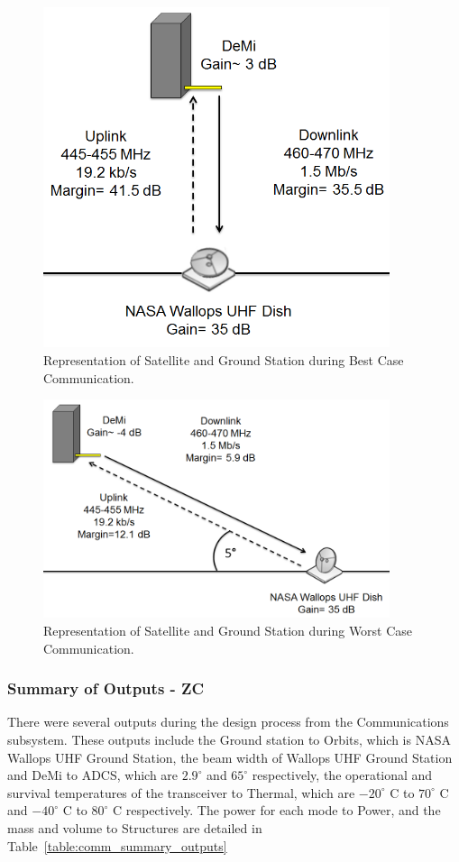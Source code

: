 \documentclass[12pt]{article}
\begin{document}
\begin{figure}[ht]\label{fig:comm_best}
\centering
  \includegraphics[width=4in]{images/comm-best.png}
\caption{Representation of Satellite and Ground Station during Best Case Communication.}
\end{figure}

\begin{figure}[ht]\label{fig:comm_worst}
\centering
  \includegraphics[width=4in]{images/comm-worst.png}
\caption{Representation of Satellite and Ground Station during Worst Case Communication.}
\end{figure}

			\subsubsection{Summary of Outputs - ZC}

There were several outputs during the design process from the Communications subsystem. These outputs include the Ground station to Orbits, which is NASA Wallops UHF Ground Station, the beam width of Wallops UHF Ground Station and DeMi to ADCS, which are $2.9^\circ$ and $65^\circ$ respectively, the operational and survival temperatures of the transceiver to Thermal, which are $-20^\circ$ C to $70^\circ$ C and $-40^\circ$ C to $80^\circ$ C respectively. The power for each mode to Power, and the mass and volume to Structures are detailed in Table~\ref{table:comm_summary_outputs}
\end{document}
